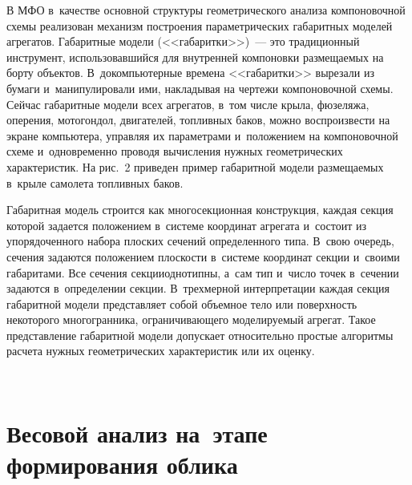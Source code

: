\begin{multicols}{2}
  
  В МФО в~качестве основной структуры геометрического анализа 
компоновочной схемы реализован механизм построения па\-ра\-мет\-ри\-че\-ских 
габаритных моделей агрегатов. Габаритные модели (<<габаритки>>)~--- это 
традиционный инструмент, ис\-поль\-зо\-вав\-ший\-ся для внут\-рен\-ней компоновки 
размещаемых на борту объектов. В~докомпьютерные времена <<габаритки>> 
вырезали из бумаги и~манипулировали ими, накладывая на чертежи 
компоновочной схемы. Сейчас габаритные модели всех агрегатов, в~том числе 
крыла, фюзеляжа, оперения, мотогондол, двигателей, топливных баков, можно 
воспроизвести на экране компьютера, управляя их параметрами и~положением 
на компоновочной схеме и~одновременно проводя вы\-чис\-ле\-ния нуж\-ных 
гео\-мет\-ри\-че\-ских характеристик. На рис.~2 приведен пример габаритной модели 
раз\-ме\-ща\-емых в~крыле самолета топливных баков. 



    Габаритная модель строится как многосекционная конструкция, каждая 
секция которой задается положением в~сис\-те\-ме координат агрегата и~состоит из 
упорядоченного набора плос\-ких сечений определенного типа. В~свою очередь, 
сечения задаются положением плос\-кости в~сис\-те\-ме координат секции и~своими 
габаритами. Все сечения секции\linebreak однотипны, а~сам тип и~число точек в~сечении 
задаются в~определении секции. В~трехмерной интерпретации каждая секция 
габаритной модели представляет собой объемное тело или по\-верх\-ность\linebreak 
некоторого многогранника, ограничивающего модели\-ру\-емый агрегат. Такое 
представление габаритной модели допускает относительно прос\-тые алгоритмы 
расчета нужных гео\-мет\-ри\-че\-ских характеристик или их оценку.

\begin{figure*} %
\vspace*{1pt}
  \begin{center}  
    \mbox{%
\epsfxsize=160mm 
}
\end{center}
\vspace*{-11pt}
\end{figure*}


\section{Весовой анализ на~этапе формирования облика}


\end{multicols}
